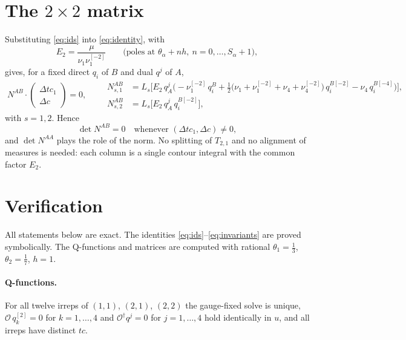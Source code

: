 \documentclass[11pt]{article}
\newcommand{\Op}{\mathcal{O}}
\newcommand{\shift}[1]{^{[#1]}}
\begin{document}
\section{The $2\times2$ matrix}

Substituting \eqref{eq:ids} into \eqref{eq:identity}, with
\begin{equation}
E_2=\frac{\mu}{\nu_1\nu_1\shift{-2}}\qquad\text{(poles at }\theta_\alpha+nh,\ n=0,\dots,S_\alpha+1),
\end{equation}
gives, for a fixed direct $q_i$ of $B$ and dual $q^j$ of $A$,
\begin{equation}
\boxed{\;
N^{AB}\cdot\begin{pmatrix}\Delta tc_1\\ \Delta c\end{pmatrix}=0,\qquad
\begin{aligned}
N^{AB}_{s,1}&=L_s\Big[E_2\,q^j_A\Big(-\nu_1\shift{-2}\,q^B_i
+\tfrac12\big(\nu_1+\nu_1\shift{-2}+\nu_4+\nu_4\shift{-2}\big)\,q_i^{B[-2]}
-\nu_4\,q_i^{B[-4]}\Big)\Big],\\
N^{AB}_{s,2}&=L_s\Big[E_2\,q^j_A\,q_i^{B[-2]}\Big],
\end{aligned}\;}
\label{eq:N}
\end{equation}
with $s=1,2$. Hence
\begin{equation}
\det N^{AB}=0\quad\text{whenever }(\Delta tc_1,\Delta c)\neq0,
\end{equation}
and $\det N^{AA}$ plays the role of the norm. No splitting of $T_{2,1}$ and no alignment of
measures is needed: each column is a single contour integral with the common factor $E_2$.

\section{Verification}

All statements below are exact. The identities \eqref{eq:ids}--\eqref{eq:invariants} are proved
symbolically. The Q-functions and matrices are computed with rational $\theta_1=\tfrac13$,
$\theta_2=\tfrac17$, $h=1$.

\paragraph{Q-functions.} For all twelve irreps of $(1,1)$, $(2,1)$, $(2,2)$ the gauge-fixed solve is
unique, $\Op\,q_k\shift{2}=0$ for $k=1,\dots,4$ and $\Op^\dagger q^j=0$ for $j=1,\dots,4$ hold
identically in $u$, and all irreps have distinct $tc$.
\end{document}
